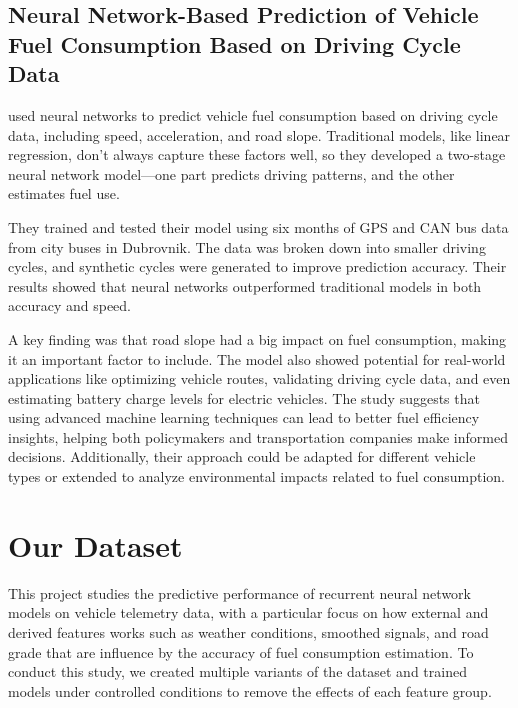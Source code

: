 \documentclass[letterpaper]{article}
\begin{document}
\subsection{Neural Network-Based Prediction of Vehicle Fuel Consumption Based on
Driving Cycle Data}

\cite{topic2022neural} used neural networks to predict vehicle fuel consumption based on
driving cycle data, including speed, acceleration, and road slope. Traditional
models, like linear regression, don't always capture these factors well, so they
developed a two-stage neural network model---one part predicts driving patterns,
and the other estimates fuel use. 

They trained and tested their model using six months of GPS and CAN bus data from city buses 
in Dubrovnik. The data was broken down into smaller driving cycles, and synthetic cycles 
were generated to improve prediction accuracy. Their results showed that neural networks 
outperformed traditional models in both accuracy and speed. 

A key finding was that road slope had a big impact on fuel consumption, making it an 
important factor to include. The model also showed potential for real-world applications 
like optimizing vehicle routes, validating driving cycle data, and even estimating battery
charge levels for electric vehicles. The study suggests that using advanced machine learning 
techniques can lead to better fuel efficiency insights, helping both policymakers and 
transportation companies make informed decisions. Additionally, their approach could be 
adapted for different vehicle types or extended to analyze environmental impacts related 
to fuel consumption.


\section*{Our Dataset}
This project studies the predictive performance of recurrent neural network 
models on vehicle telemetry data, with a particular focus on how external 
and derived features works such as weather conditions, smoothed signals, 
and road grade that are influence by the accuracy of fuel consumption 
estimation. To conduct this study, we created multiple variants of the 
dataset and trained models under controlled conditions to remove the 
effects of each feature group.
\end{document}
